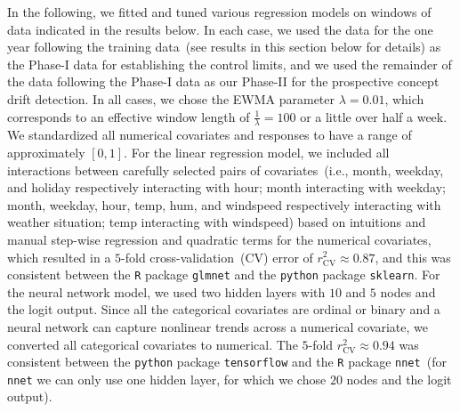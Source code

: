 \documentclass[twoside,11pt]{article}
\begin{document}
In the following, we fitted and tuned various regression models on windows of data indicated in the results below. In each case, we used the data for the one year following the training data~(see results in this section below for details) as the Phase-I data for establishing the control limits, and we used the remainder of the data following the Phase-I data as our Phase-II for the prospective concept drift detection. In all cases, we chose the EWMA parameter $ \lambda = 0.01$, which corresponds to an effective window length of $\frac{1}{\lambda}=100$ or a little over half a week. We standardized all numerical covariates and responses to have a range of approximately $[0,1]$. For the linear regression model, we included all interactions between carefully selected pairs of covariates~(i.e., month, weekday, and holiday respectively interacting with hour; month interacting with weekday; month, weekday, hour, temp, hum, and windspeed respectively interacting with weather situation; temp interacting with windspeed) based on intuitions and manual step-wise regression and quadratic terms for the numerical covariates, %
which resulted in a $5$-fold cross-validation~(CV) error of $r^2_{\mathrm{CV}} \approx 0.87$, and this was consistent between the \texttt{R} package \texttt{glmnet} and the \texttt{python} package \texttt{sklearn}. For the neural network model, we used two hidden layers with $10$ and $5$ nodes and the logit output. Since all the categorical covariates are ordinal or binary and a neural network can capture nonlinear trends across a numerical covariate, we converted all categorical covariates to numerical. The $5$-fold $r^2_{\mathrm{CV}} \approx 0.94$ was consistent between the \texttt{python} package \texttt{tensorflow} and the \texttt{R} package \texttt{nnet}~(for \texttt{nnet} we can only use one hidden layer, for which we chose $20$ nodes and the logit output). %
\end{document}
